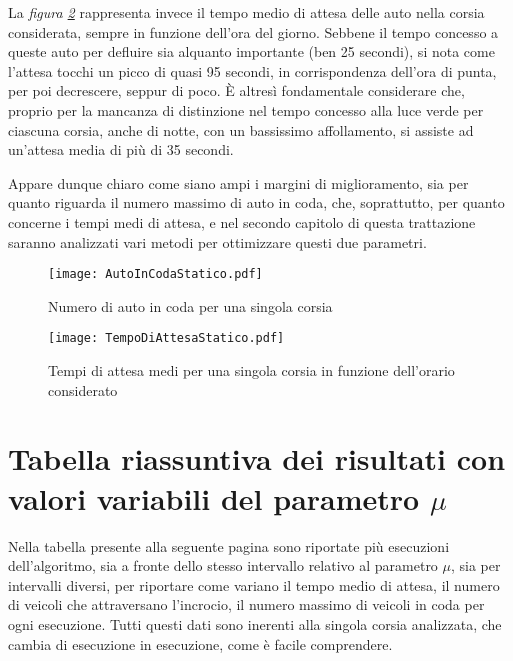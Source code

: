 La \textit{figura \ref{fig:TempoDiAttesaStatico}} rappresenta invece il tempo medio di attesa delle auto nella corsia considerata, sempre in funzione dell’ora del giorno. Sebbene il tempo concesso a queste auto per defluire sia alquanto importante (ben 25 secondi), si nota come l’attesa tocchi un picco di quasi 95 secondi, in corrispondenza dell’ora di punta, per poi decrescere, seppur di poco. È altresì fondamentale considerare che, proprio per la mancanza di distinzione nel tempo concesso alla luce verde per ciascuna corsia, anche di notte, con un bassissimo affollamento, si assiste ad un’attesa media di più di 35 secondi.

Appare dunque chiaro come siano ampi i margini di miglioramento, sia per quanto riguarda il numero massimo di auto in coda, che, soprattutto, per quanto concerne i tempi medi di attesa, e nel secondo capitolo di questa trattazione saranno analizzati vari metodi per ottimizzare questi due parametri.
\begin{center}
	\begin{figure}[H]
  \texttt{[image: AutoInCodaStatico.pdf]}
  \caption{Numero di auto in coda per una singola corsia}
  \label{fig:AutoInCodaStatico}
\end{figure}
\begin{figure}[H]
  \texttt{[image: TempoDiAttesaStatico.pdf]}
  \caption{Tempi di attesa medi per una singola corsia in funzione dell'orario considerato}
  \label{fig:TempoDiAttesaStatico}
\end{figure}
\end{center}
\section{Tabella riassuntiva dei risultati con valori variabili del parametro $\mu$}

Nella tabella presente alla seguente pagina sono riportate più esecuzioni dell'algoritmo, sia a fronte dello stesso intervallo relativo al parametro $\mu$, sia per intervalli diversi, per riportare come variano il tempo medio di attesa, il numero di veicoli che attraversano l'incrocio, il numero massimo di veicoli in coda per ogni esecuzione. Tutti questi dati sono inerenti alla singola corsia analizzata, che cambia di esecuzione in esecuzione, come è facile comprendere. 

